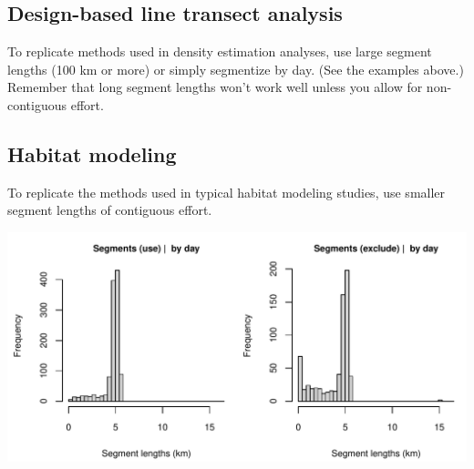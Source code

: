 \documentclass[
]{book}
\newenvironment{Shaded}{\begin{snugshade}}{\end{snugshade}}
\newcommand{\AttributeTok}[1]{\textcolor[rgb]{0.13,0.29,0.53}{#1}}
\newcommand{\CommentTok}[1]{\textcolor[rgb]{0.56,0.35,0.01}{\textit{#1}}}
\newcommand{\ConstantTok}[1]{\textcolor[rgb]{0.56,0.35,0.01}{#1}}
\newcommand{\DecValTok}[1]{\textcolor[rgb]{0.00,0.00,0.81}{#1}}
\newcommand{\FunctionTok}[1]{\textcolor[rgb]{0.13,0.29,0.53}{\textbf{#1}}}
\newcommand{\NormalTok}[1]{#1}
\newcommand{\OtherTok}[1]{\textcolor[rgb]{0.56,0.35,0.01}{#1}}
\newcommand{\SpecialCharTok}[1]{\textcolor[rgb]{0.81,0.36,0.00}{\textbf{#1}}}
\newcommand{\StringTok}[1]{\textcolor[rgb]{0.31,0.60,0.02}{#1}}
\begin{document}
\hypertarget{design-based-line-transect-analysis}{%
\subsection*{Design-based line transect analysis}\label{design-based-line-transect-analysis}}

To replicate methods used in density estimation analyses, use large segment lengths (100 km or more) or simply segmentize by day. (See the examples above.) Remember that long segment lengths won't work well unless you allow for non-contiguous effort.

\hypertarget{habitat-modeling}{%
\subsection*{Habitat modeling}\label{habitat-modeling}}

To replicate the methods used in typical habitat modeling studies, use smaller segment lengths of contiguous effort.

\begin{Shaded}
\end{Shaded}

\includegraphics{figures/unnamed-chunk-405-1.pdf}
\end{document}
